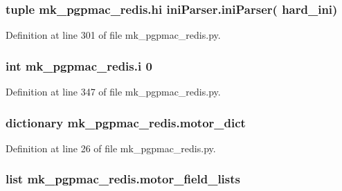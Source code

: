 \hypertarget{namespacemk__pgpmac__redis_af0e472a4df25fc5c1660ef07226689a8}{
\subsubsection[{hi}]{\setlength{\rightskip}{0pt plus 5cm}tuple mk\-\_\-pgpmac\-\_\-redis.\-hi {\bf ini\-Parser.\-ini\-Parser}( {\bf hard\-\_\-ini})}}\label{namespacemk__pgpmac__redis_af0e472a4df25fc5c1660ef07226689a8}


Definition at line 301 of file mk\-\_\-pgpmac\-\_\-redis.\-py.

\hypertarget{namespacemk__pgpmac__redis_afa643a23a5984fe44c2182ada3dfa401}{
\subsubsection[{i}]{\setlength{\rightskip}{0pt plus 5cm}int mk\-\_\-pgpmac\-\_\-redis.\-i 0}}\label{namespacemk__pgpmac__redis_afa643a23a5984fe44c2182ada3dfa401}


Definition at line 347 of file mk\-\_\-pgpmac\-\_\-redis.\-py.

\hypertarget{namespacemk__pgpmac__redis_ad8583d4fe88c4c98af73d2858c51c660}{
\subsubsection[{motor\-\_\-dict}]{\setlength{\rightskip}{0pt plus 5cm}dictionary mk\-\_\-pgpmac\-\_\-redis.\-motor\-\_\-dict}}\label{namespacemk__pgpmac__redis_ad8583d4fe88c4c98af73d2858c51c660}


Definition at line 26 of file mk\-\_\-pgpmac\-\_\-redis.\-py.

\hypertarget{namespacemk__pgpmac__redis_a7228dc1b6ecec376538db1efe8c05ffb}{
\subsubsection[{motor\-\_\-field\-\_\-lists}]{\setlength{\rightskip}{0pt plus 5cm}list mk\-\_\-pgpmac\-\_\-redis.\-motor\-\_\-field\-\_\-lists}}\label{namespacemk__pgpmac__redis_a7228dc1b6ecec376538db1efe8c05ffb}


